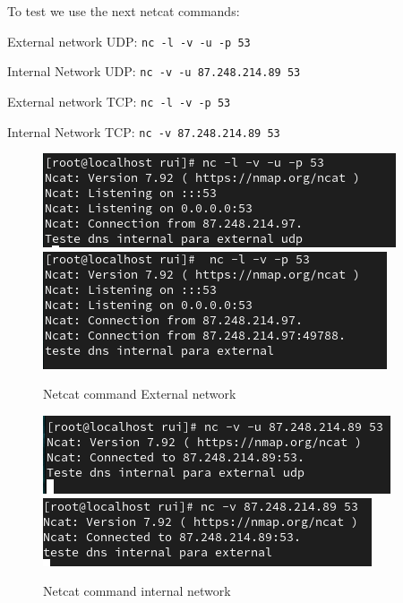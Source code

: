 \documentclass{article}
\begin{document}
To test we use the next netcat commands:
\texttt{}\par
\texttt{}\par
External network UDP: \texttt{nc -l -v -u -p 53} \par
Internal Network UDP: \texttt{nc -v -u 87.248.214.89 53} \par
\texttt{}\par
\texttt{}\par
External network TCP: \texttt{nc -l -v -p 53} \par
Internal Network TCP: \texttt{nc -v 87.248.214.89 53} \par
\texttt{}\par
\begin{figure}[H]
    \centering
    \includegraphics[scale=0.5]{out/out_dns_external_udp.png}
    \includegraphics[scale=0.5]{out/out_dns_external.png}
    \caption{Netcat command External network}
    \label{fig:network-arc}
\end{figure}

\begin{figure}[H]
    \centering
    \includegraphics[scale=0.5]{out/out_dns_internal_udp.png}
    \includegraphics[scale=0.5]{out/out_dns_internal.png}
    \caption{Netcat command internal network}
    \label{fig:network-arc}
\end{figure}
\end{document}
